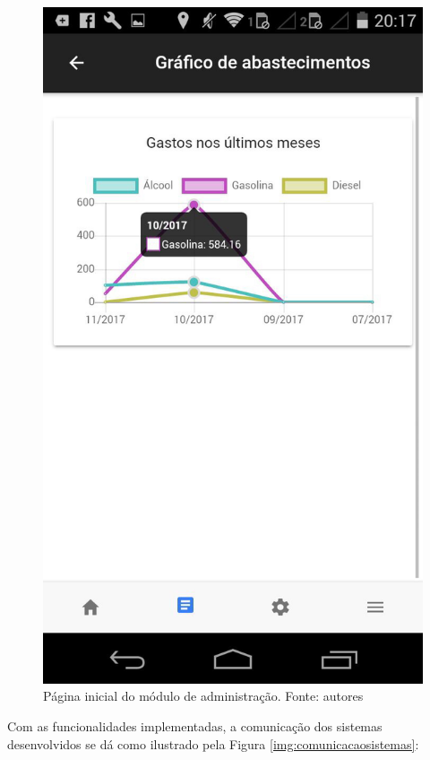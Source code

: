 \begin{figure}[H]
    \centering
    \includegraphics[scale=0.2]{figuras/grafico-app.jpg}
    \caption[Página inicial do módulo de administração]{Página inicial do módulo de administração. Fonte: autores}
    \label{img:grafico-app}
\end{figure}
\pagebreak

Com as funcionalidades implementadas, a comunicação dos sistemas desenvolvidos se dá como ilustrado pela Figura \ref{img:comunicacaosistemas}:

